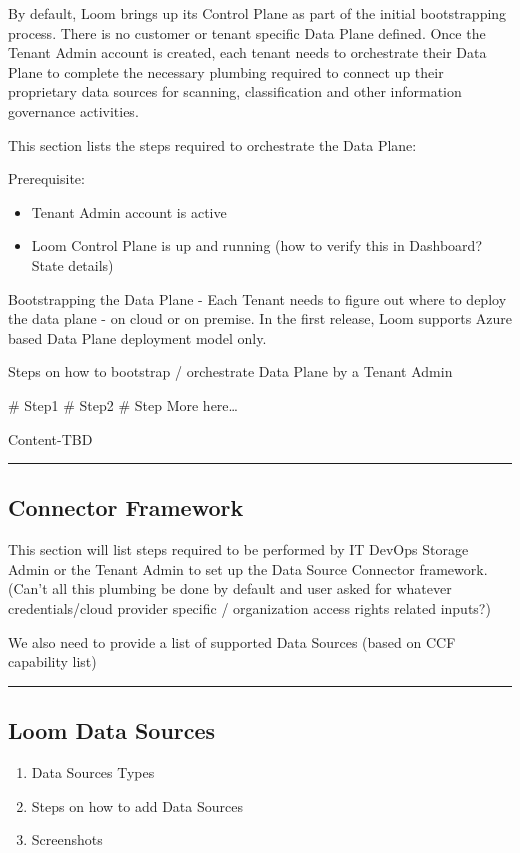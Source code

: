 \documentclass[letterpaper,10pt,english]{sphinxmanual}
\begin{document}
By default, Loom brings up its Control Plane as part of the initial bootstrapping process.  There is no customer or tenant specific Data Plane defined.  Once the Tenant Admin account is created, each tenant needs to orchestrate their Data Plane to complete the necessary plumbing required to connect up their proprietary data sources for scanning, classification and other information governance activities.

This section lists the steps required to orchestrate the Data Plane:

Prerequisite:
\begin{itemize}
\item {} 
Tenant Admin account is active

\item {} 
Loom Control Plane is up and running (how to verify this in Dashboard? State details)

\end{itemize}

Bootstrapping the Data Plane - Each Tenant needs to figure out where to deploy the data plane - on cloud or on premise. In the first release, Loom supports Azure based Data Plane deployment model only.

Steps on how to bootstrap / orchestrate Data Plane by a Tenant Admin

\# Step1
\# Step2
\# Step More here…

Content-TBD


\bigskip\hrule\bigskip



\subsection{Connector Framework}
\label{\detokenize{loom_getting_started_guide:connector-framework}}
This section will list steps required to be performed by IT DevOps  Storage Admin or the Tenant Admin to set up the Data Source Connector framework.  (Can’t all this plumbing be done by default and user asked for whatever credentials/cloud provider specific / organization access rights related inputs?)

We also need to provide a list of supported Data Sources (based on CCF capability list)


\bigskip\hrule\bigskip



\subsection{Loom Data Sources}
\label{\detokenize{loom_getting_started_guide:loom-data-sources}}\begin{enumerate}
\item {} 
Data Sources Types

\item {} 
Steps on how to add Data Sources

\item {} 
Screenshots

\end{enumerate}
\end{document}
